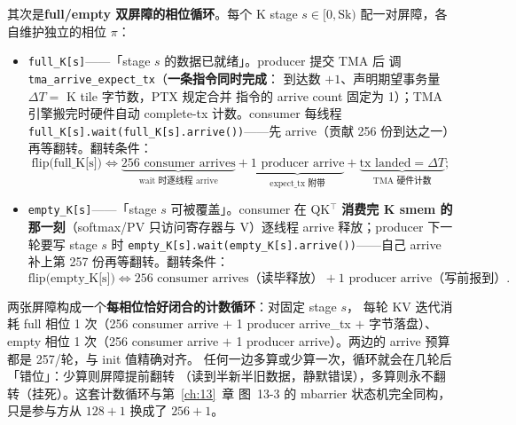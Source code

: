 其次是\textbf{full/empty 双屏障的相位循环}。每个 K stage $s \in [0,
\mathrm{Sk})$ 配一对屏障，各自维护独立的相位 $\pi$：
\begin{itemize}
  \item \texttt{full\_K[s]}——「stage $s$ 的数据已就绪」。producer 提交 TMA 后
        调 \texttt{tma\_\allowbreak{}arrive\_\allowbreak{}expect\_\allowbreak{}tx}（\textbf{一条指令同时完成}：
        到达数 $+1$、声明期望事务量 $\Delta T = $ K tile 字节数，PTX 规定合并
        指令的 arrive count 固定为 1）；TMA 引擎搬完时硬件自动 complete-tx
        计数。consumer 每线程
        \texttt{full\_\allowbreak{}K[s].wait\allowbreak{}(full\_\allowbreak{}K[s].arrive\allowbreak{}())}——先 arrive（贡献
        256 份到达之一）再等翻转。翻转条件：
        \begin{equation}
          \text{flip(full\_K[s])} \iff
          \underbrace{256 \text{ consumer arrives}}_{\text{wait 时逐线程 arrive}}
          + \underbrace{1 \text{ producer arrive}}_{\text{expect\_tx 附带}}
          + \underbrace{\text{tx landed} = \Delta T}_{\text{TMA 硬件计数}} ;
          \label{eq:17-flip-full}
        \end{equation}
  \item \texttt{empty\_K[s]}——「stage $s$ 可被覆盖」。consumer 在 QK$^\top$
        \textbf{消费完 K smem 的那一刻}（softmax/PV 只访问寄存器与 V）逐线程
        arrive 释放；producer 下一轮要写 stage $s$ 时
        \texttt{empty\_\allowbreak{}K[s].wait\allowbreak{}(empty\_\allowbreak{}K[s].arrive\allowbreak{}())}——自己 arrive 补上第
        257 份再等翻转。翻转条件：
        \begin{equation}
          \text{flip(empty\_K[s])} \iff
          256 \text{ consumer arrives（读毕释放）} +
          1 \text{ producer arrive（写前报到）} .
          \label{eq:17-flip-empty}
        \end{equation}
\end{itemize}

两张屏障构成一个\textbf{每相位恰好闭合的计数循环}：对固定 stage $s$，
每轮 KV 迭代消耗 full 相位 1 次（256 consumer arrive $+$ 1 producer
arrive\_tx $+$ 字节落盘）、empty 相位 1 次（256 consumer arrive $+$ 1
producer arrive）。两边的 arrive 预算都是 257/轮，与 init 值精确对齐。
任何一边多算或少算一次，循环就会在几轮后「错位」：少算则屏障提前翻转
（读到半新半旧数据，静默错误），多算则永不翻转（挂死）。这套计数循环与第~\ref{ch:13}~章
图~13-3 的 mbarrier 状态机完全同构，只是参与方从 $128+1$ 换成了 $256+1$。


